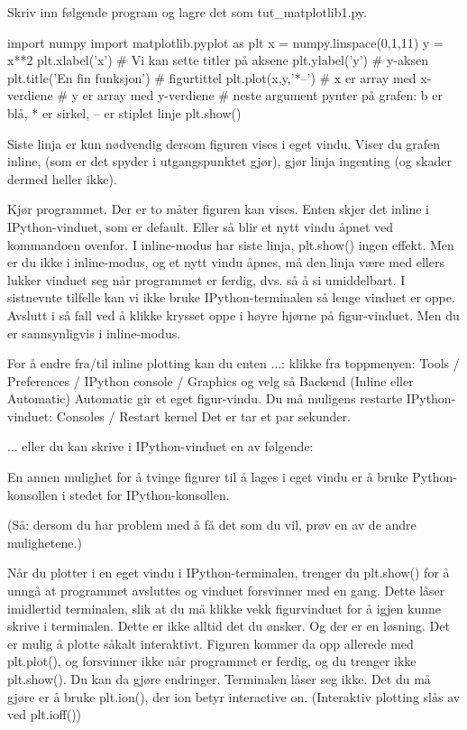 \documentclass[a4paper,11pt,utf8]{book}
\begin{document}
Skriv inn følgende program og lagre det som tut_matplotlib1.py. 

import numpy 
import matplotlib.pyplot as plt 
x = numpy.linspace(0,1,11)
y = x**2
plt.xlabel('x')   # Vi kan sette titler på aksene
plt.ylabel('y')   # y-aksen
plt.title('En fin funksjon')    # figurtittel 
plt.plot(x,y,'*--') 
  # x er array med x-verdiene
  # y er array med y-verdiene
  # neste argument pynter på grafen: b er blå, * er sirkel, -- er stiplet linje
plt.show()   

Siste linja er kun nødvendig dersom figuren vises i eget vindu. 
Viser du grafen inline, (som er det spyder i utgangspunktet gjør), 
gjør linja ingenting (og skader dermed heller ikke). 

Kjør programmet. 
Der er to måter figuren kan vises.
Enten skjer det inline i IPython-vinduet, som er default. 
Eller så blir et nytt vindu åpnet ved kommandoen ovenfor. 
I inline-modus har siste linja, plt.show() ingen effekt. 
Men er du ikke i inline-modus, og et nytt vindu åpnes, må den linja være med 
ellers lukker vinduet seg når programmet er ferdig, dvs. så å si umiddelbart.  
I sistnevnte tilfelle kan vi ikke bruke IPython-terminalen så lenge vinduet er oppe. 
Avslutt i så fall ved å klikke krysset oppe i høyre hjørne på figur-vinduet. 
Men du er sannsynligvis i inline-modus. 

For å endre fra/til inline plotting kan du enten ...:
klikke fra toppmenyen: 
Tools / Preferences / IPython console / Graphics
og velg så Backend (Inline eller Automatic) 
Automatic gir et eget figur-vindu.
Du må muligens restarte IPython-vinduet: Consoles / Restart kernel
Det er tar et par sekunder.

... eller du kan skrive i IPython-vinduet en av følgende: 


En annen mulighet for å tvinge figurer til å lages i eget vindu er å bruke 
Python-konsollen i stedet for IPython-konsollen. 

(Så: dersom du har problem med å få det som du vil, prøv en av de andre mulighetene.) 



Når du plotter i en eget vindu i IPython-terminalen, trenger du plt.show() 
for å unngå at programmet avsluttes og vinduet forsvinner med en gang. 
Dette låser imidlertid terminalen, slik at du må klikke vekk figurvinduet 
for å igjen kunne skrive i terminalen. 
Dette er ikke alltid det du ønsker. 
Og der er en løsning. 
Det er mulig å plotte såkalt interaktivt. 
Figuren kommer da opp allerede med plt.plot(), og forsvinner ikke når programmet er ferdig, 
og du trenger ikke plt.show(). 
Du kan da gjøre endringer. Terminalen låser seg ikke. 
Det du må gjøre er å bruke plt.ion(), der ion betyr interactive on. 
(Interaktiv plotting slås av ved plt.ioff()) 
\end{document}
